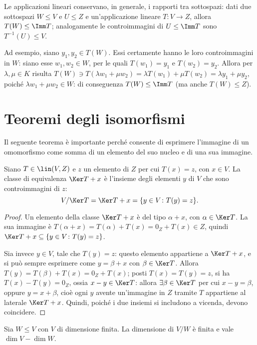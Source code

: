 \begin{osservazione} \label{o:applicazioni-sottospazi}
	Le applicazioni lineari conservano, in generale, i rapporti tra sottospazi: dati due sottospazi $W\le V$ e $U\le Z$ e un'applicazione lineare $T\colon V\to Z$, allora $T(W)\leq \Imm T$; analogamente le controimmagini di $U\le \Imm T$ sono $T^{-1}(U)\leq V$.

	Ad esempio, siano $y_1,y_2\in T(W)$.
	Essi certamente hanno le loro controimmagini in $W$: siano esse $w_1,w_2\in W$, per le quali $T(w_1)=y_1$ e $T(w_2)=y_2$.
	Allora per $\lambda,\mu\in K$ risulta $T(W)\ni T(\lambda w_1+\mu w_2)=\lambda T(w_1)+\mu T(w_2)=\lambda y_1+\mu y_2$, poiché $\lambda w_1+\mu w_2\in W$: di conseguenza $T(W)\le\Imm T$ (ma anche $T(W)\le Z$).
\end{osservazione}

\section{Teoremi degli isomorfismi}
Il seguente teorema è importante perché consente di esprimere l'immagine di un omomorfismo come somma di un elemento del suo nucleo e di una sua immagine.
\begin{teorema}
	Siano $T\in\lin(V,Z)$ e $  z$ un elemento di $Z$ per cui $T(x)=z$, con $  x\in V$.
	La classe di equivalenza $\Ker T+  x$ è l'insieme degli elementi $  y$ di $V$ che sono controimmagini di $  z$:
	\begin{equation*}
		V/ \Ker T = \Ker T+  x=\{  y\in V\colon T(  y)=  z\}.
	\end{equation*}
\end{teorema}
\begin{proof}
	Un elemento della classe $\Ker T+  x$ è del tipo $\alpha+  x$, con $\alpha\in\Ker T$.
	La sua immagine è $T(\alpha+  x)=T(\alpha)+T(  x)=0_Z+T(  x)\in Z$, quindi $\Ker T+  x\subseteq\{  y\in V\colon T(  y)=  z\}$.

	Sia invece $  y\in V$, tale che $T(  y)=  z$: questo elemento appartiene a $\Ker T+  x$, e si può sempre esprimere come $y=\beta+  x$ con $\beta\in\Ker T$.
	Allora $T(  y)=T(\beta)+T(  x)=0_Z+T(  x)$; posti $T(  x)=T(  y)=  z$, si ha $T(  x)-T(  y)=0_Z$, ossia $  x-  y\in\Ker T$: allora $\exists\beta\in\Ker T$ per cui $  x-  y=\beta$, oppure $  y=  x+\beta$, cioè ogni $  y$ avente un'immagine in $Z$ tramite $T$ appartiene al laterale $\Ker T+  x$.
	Quindi, poiché i due insiemi si includono a vicenda, devono coincidere.
\end{proof}
\begin{teorema} \label{t:dimensione-quoziente}
	Sia $W\leq V$ con $V$ di dimensione finita.
	La dimensione di $V/W$ è finita e vale $\dim V-\dim W$.
\end{teorema}
